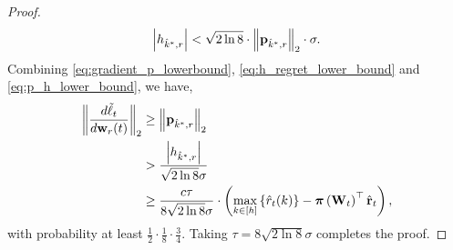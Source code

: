 \begin{proof}
\begin{equation}
\label{eq:p_h_lower_bound}
\begin{split}
	\left| h_{\hat{k}^*,r} \right| < \sqrt{2 \ln{8}} \cdot \left\| {\mathbf{p}}_{\hat{k}^*, r} \right\|_2 \cdot \sigma.
\end{split}
\end{equation}
Combining \cref{eq:gradient_p_lowerbound}, \cref{eq:h_regret_lower_bound} and \cref{eq:p_h_lower_bound}, we have,
\begin{equation*}
\begin{split}
	\left\| \frac{d\tilde{\ell}_t}{d {\mathbf{w}}_r(t)} \right\|_2 &\ge \left\| {\mathbf{p}}_{\hat{k}^*, r}\right\|_2 \\
	&> \frac{\left| h_{\hat{k}^*,r} \right|}{\sqrt{2 \ln{8}} \sigma} \\
	&\ge \frac{c\tau}{8 \sqrt{2 \ln{8}} \sigma} \cdot \left( \max\limits_{k \in \left[h\right]}\left\{ \hat{r}_t(k) \right\} - {\boldsymbol{\pi}}\left( {\mathbf{W}}_t \right)^\top \hat{{\mathbf{r}}}_t  \right),
\end{split}
\end{equation*}
with probability at least $\frac{1}{2}  \cdot \frac{1}{8} \cdot \frac{3}{4} $. Taking $\tau = 8 \sqrt{2 \ln{8}} \sigma$ completes the proof.
\end{proof}

